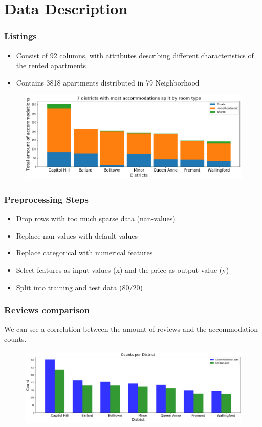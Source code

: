 \documentclass{beamer}
\begin{document}
\section{Data Description}

\begin{frame}
\frametitle{Listings}
\begin{itemize}
\item Consist of 92 columns, with attributes describing different characteristics of the rented apartments
\item Contains 3818 apartments distributed in 79 Neighborhood
\end{itemize}
\begin{figure}
\includegraphics[width=0.8\linewidth]{photo/4_most_acc_split_by_roomtype}
\end{figure}
\end{frame}
\begin{frame}
\frametitle{Preprocessing Steps}
\begin{itemize}
\item Drop rows with too much sparse data (nan-values)
\item Replace nan-values with default values
\item Replace categorical with numerical features
\item Select features as input values (x) and the price as output value (y)
\item Split into training and test data (80/20)
\end{itemize}
\end{frame}


\begin{frame}
\frametitle{Reviews comparison}
We can see a correlation between the amount of reviews and the accommodation counts. 
\begin{figure}
\includegraphics[width=0.8\linewidth]{photo/3_count_per_district}
\end{figure}
\end{frame}
\end{document}
